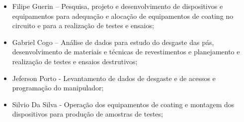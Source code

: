 \begin{itemize}
  \item Filipe Guerin – Pesquisa, projeto e desenvolvimento de dispositivos e
  equipamentos para adequação e alocação de equipamentos de coating no circuito
  e para a realização de testes e ensaios;
  \item Gabriel Cogo – Análise de dados para estudo do desgaste das pás,
  desenvolvimento de materiais e técnicas de revestimentos e planejamento e
  realização de testes e ensaios destrutivos;
  \item Jeferson Porto - Levantamento de dados de desgaste e de acessos e
  programação do manipulador;
  \item Silvio Da Silva - Operação dos equipamentos de coating e montagem dos
  dispositivos para produção de amostras de testes;
\end{itemize}


















    
    
  
